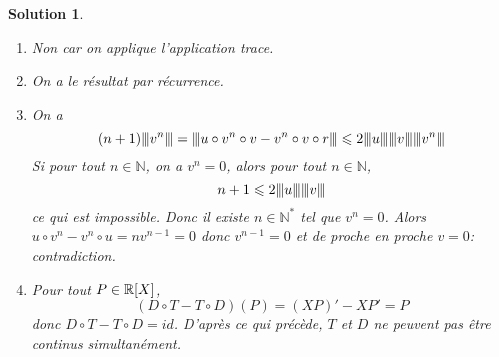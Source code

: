 \documentclass[12pt]{article}
\newtheorem{solution}{Solution}[section]
\theoremstyle{remark}
\newcommand{\N}{\mathbb{N}} \newcommand{\Z}{\mathbb{Z}}
\newcommand{\vertiii}[1]{{\left\vert\kern-0.25ex\left\vert\kern-0.25ex\left\vert{}#1
\right\vert\kern-0.25ex\right\vert\kern-0.25ex\right\vert}}
\begin{document}
\begin{solution}
	\phantom{}
	\begin{enumerate}
		\item Non car on applique l'application trace.
		\item On a le résultat par récurrence.
		\item On a 
		$$(n+1)\vertiii{v^{n}}=\vertiii{u\circ v^{n}\circ v-v^{n}\circ v\circ r}\leqslant 2\vertiii{u}\vertiii{v}\vertiii{v^{n}}$$
		Si pour tout $n\in\N$, on a $v^{n}=0$, alors pour tout $n\in\N$,
		$$n+1\leqslant 2\vertiii{u}\vertiii{v}$$
		ce qui est impossible. Donc il existe $n\in\N^{*}$ tel que $v^{n}=0$. Alors $u\circ v^{n}-v^{n}\circ u=nv^{n-1}=0$ donc $v^{n-1}=0$ et de proche en proche $v=0$: contradiction.
		\item Pour tout $P\in\mathbb{R}[X]$, 
		$$(D\circ T-T\circ D)(P)=(XP)'-XP'=P$$
		donc $D\circ T-T\circ D=id$. D'après ce qui précède, $T$ et $D$ ne peuvent pas être continus simultanément.
	\end{enumerate}
\end{solution}
\end{document}
